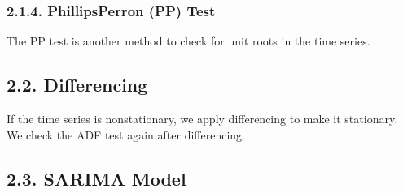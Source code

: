 \documentclass[letterpaper,10pt,english]{sphinxmanual}
\begin{document}
\subsubsection{2.1.4. Phillips\sphinxhyphen{}Perron (PP) Test}
\label{\detokenize{index:phillips-perron-pp-test}}
\sphinxAtStartPar
The PP test is another method to check for unit roots in the time series.

\begin{sphinxVerbatim}[commandchars=\\\{\}]
 
  \PYG{p}{[}\PYG{p}{]}
  
  
\end{sphinxVerbatim}


\subsection{2.2. Differencing}
\label{\detokenize{index:differencing}}
\sphinxAtStartPar
If the time series is non\sphinxhyphen{}stationary, we apply differencing to make it stationary. We check the ADF test again after differencing.

\begin{sphinxVerbatim}[commandchars=\\\{\}]
  \PYG{p}{[}\PYG{p}{]}
\end{sphinxVerbatim}


\subsection{2.3. SARIMA Model}
\label{\detokenize{index:sarima-model}}
\end{document}
